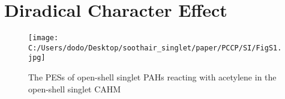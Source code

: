 \documentclass[10pt]{article}
\begin{document}
\newpage

\section{\large{} Diradical Character Effect}

\quad

\begin{figure}[!h]
\texttt{[image: C:/Users/dodo/Desktop/soothair\_singlet/paper/PCCP/SI/FigS1.jpg]}
\caption{The PESs of open-shell singlet PAHs reacting with acetylene
in the open-shell singlet CAHM}
\end{figure}
\end{document}
